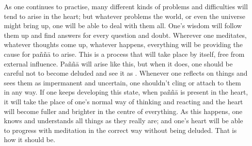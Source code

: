 As one continues to practise, many different kinds of problems and difficulties will tend to arise in the heart; but whatever problems the world, or even the universe might bring up, one will be able to deal with them all. One's wisdom will follow them up and find answers for every question and doubt. Wherever one meditates, whatever thoughts come up, whatever happens, everything will be providing the cause for pa\~n\~n\=a to arise. This is a process that will take place by itself, free from external influence. Pa\~n\~n\=a will arise like this, but when it does, one should be careful not to become deluded and see it as . Whenever one reflects on things and sees them as impermanent and uncertain, one shouldn't cling or attach to them in any way. If one keeps developing this state, when pa\~n\~n\=a is present in the heart, it will take the place of one's normal way of thinking and reacting and the heart will become fuller and brighter in the centre of everything. As this happens, one knows and understands all things as they really are; and one's heart will be able to progress with meditation in the correct way without being deluded. That is how it should be.  
